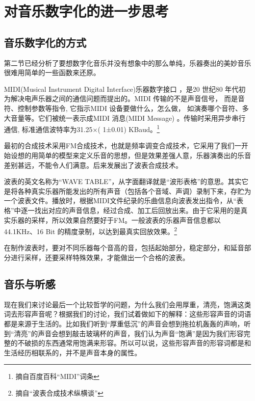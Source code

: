 \section{对音乐数字化的进一步思考}
\subsection{音乐数字化的方式}
\par
第二节已经分析了要想数字化音乐并没有想象中的那么单纯，乐器奏出的美妙音乐很难用简单的一些函数来还原。
\par
MIDI(Musical Instrument Digital Interface)乐器数字接口 ，是20 世纪80 年代初为解决电声乐器之间的通信问题而提出的。MIDI 传输的不是声音信号， 而是音符、控制参数等指令, 它指示MIDI 设备要做什么，怎么做， 如演奏哪个音符、多大音量等。它们被统一表示成MIDI 消息(MIDI Message) 。传输时采用异步串行通信, 标准通信波特率为31.25×( 1±0.01) KBaud。\footnote{摘自百度百科“MIDI”词条}
\par
最初的合成技术采用FM合成技术，也就是频率调变合成技术，它采用了我们一开始设想的用简单的模型来定义乐音的思想，但是效果差强人意，乐器演奏出的乐音差别甚远，不能令人们满意。后来发展出了波表合成技术。
\par
波表的英文名称为“WAVE TABLE”，从字面翻译就是“波形表格”的意思。其实它是将各种真实乐器所能发出的所有声音（包括各个音域、声调）录制下来，存贮为一个波表文件。播放时，根据MIDI文件纪录的乐曲信息向波表发出指令，从“表格”中逐一找出对应的声音信息，经过合成、加工后回放出来。由于它采用的是真实乐器的采样，所以效果自然要好于FM。一般波表的乐器声音信息都以44.1KHz、16 Bit 的精度录制，以达到最真实回放效果。\footnote{摘自“波表合成技术纵横谈”}
\par 
在制作波表时，要对不同乐器每个音高的音，包括起始部分，稳定部分，和延音部分进行采样，还要采样特殊效果，才能做出一个合格的波表。
\subsection{音乐与听感}
现在我们来讨论最后一个比较哲学的问题，为什么我们会用厚重，清亮，饱满这类词去形容声音呢？根据我们的讨论，我们试着做如下的解释：这些形容声音的词语都是来源于生活的。比如我们听到“厚重低沉”的声音会想到拖拉机轰轰的声响，听到“清亮”的声音会想到敲击玻璃杯的声音，我们认为声音“饱满”是因为我们形容完整的不破损的东西通常用饱满来形容。所以可以说，这些形容声音的形容词都是和生活经历相联系的，并不是声音本身的属性。
